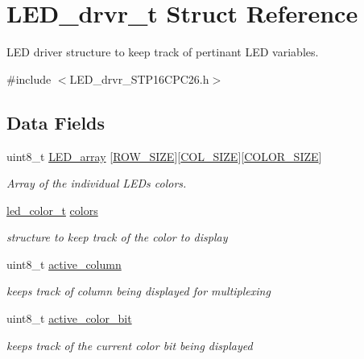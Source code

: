 \hypertarget{struct_l_e_d__drvr__t}{}\section{L\+E\+D\+\_\+drvr\+\_\+t Struct Reference}
\label{struct_l_e_d__drvr__t}


L\+ED driver structure to keep track of pertinant L\+ED variables.  




{\ttfamily \#include $<$L\+E\+D\+\_\+drvr\+\_\+\+S\+T\+P16\+C\+P\+C26.\+h$>$}

\subsection*{Data Fields}
\begin{DoxyCompactItemize}
\item 
uint8\+\_\+t \hyperlink{struct_l_e_d__drvr__t_a7f01ed87a74212d270cae32130977184}{L\+E\+D\+\_\+array} \mbox{[}\hyperlink{_l_e_d__drvr___s_t_p16_c_p_c26_8h_aa4d030604a90c8d019d90fc721900d63}{R\+O\+W\+\_\+\+S\+I\+ZE}\mbox{]}\mbox{[}\hyperlink{_l_e_d__drvr___s_t_p16_c_p_c26_8h_a99468544016f0abb855e6415c629ec29}{C\+O\+L\+\_\+\+S\+I\+ZE}\mbox{]}\mbox{[}\hyperlink{_l_e_d__drvr___s_t_p16_c_p_c26_8h_a68a80be4e42506b0127b8559bc6662b0}{C\+O\+L\+O\+R\+\_\+\+S\+I\+ZE}\mbox{]}
\begin{DoxyCompactList}\small\item\em Array of the individual L\+E\+Ds colors. \end{DoxyCompactList}\item 
\hyperlink{structled__color__t}{led\+\_\+color\+\_\+t} \hyperlink{struct_l_e_d__drvr__t_a544f37552e92b00030921908e34edda4}{colors}
\begin{DoxyCompactList}\small\item\em structure to keep track of the color to display \end{DoxyCompactList}\item 
uint8\+\_\+t \hyperlink{struct_l_e_d__drvr__t_a736bd2bd907652812bf3a1f3d20eb9ae}{active\+\_\+column}
\begin{DoxyCompactList}\small\item\em keeps track of column being displayed for multiplexing \end{DoxyCompactList}\item 
uint8\+\_\+t \hyperlink{struct_l_e_d__drvr__t_a36030c0b3d311ba697fb3e70ad7680a2}{active\+\_\+color\+\_\+bit}
\begin{DoxyCompactList}\small\item\em keeps track of the current color bit being displayed \end{DoxyCompactList}\end{DoxyCompactItemize}



